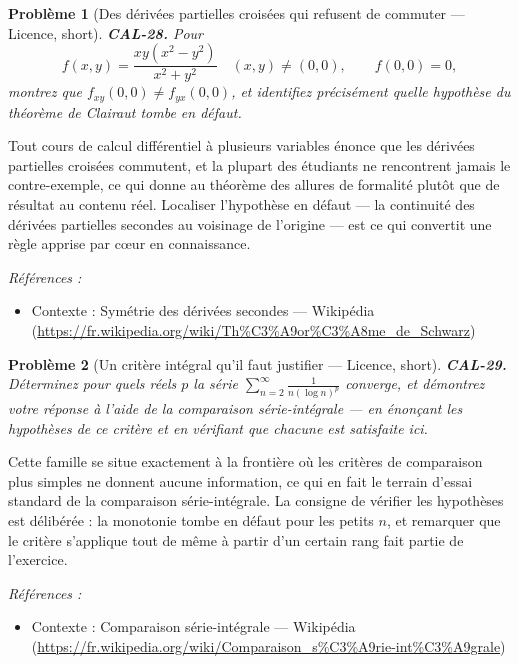 \documentclass[11pt]{article}
\newtheorem{problem}{Problème}
\newenvironment{refs}{\par\small\noindent\emph{Références :}\begin{itemize}\setlength\itemsep{0pt}}{\end{itemize}\normalsize}
\begin{document}
\bigskip

\begin{problem}[{Des dérivées partielles croisées qui refusent de commuter --- Licence, short}]
\textbf{CAL-28.} Pour
\[ f(x,y) = \frac{xy(x^2 - y^2)}{x^2 + y^2} \quad (x,y) \neq (0,0), \qquad f(0,0) = 0, \]
montrez que $ f_{xy}(0,0) \neq f_{yx}(0,0) $, et identifiez précisément quelle hypothèse du théorème de Clairaut tombe en défaut.
\end{problem}

\noindent Tout cours de calcul différentiel à plusieurs variables énonce que les dérivées partielles croisées commutent, et la plupart des étudiants ne rencontrent jamais le contre-exemple, ce qui donne au théorème des allures de formalité plutôt que de résultat au contenu réel. Localiser l'hypothèse en défaut --- la continuité des dérivées partielles secondes au voisinage de l'origine --- est ce qui convertit une règle apprise par c\oe{}ur en connaissance.

\begin{refs}
\item Contexte : Symétrie des dérivées secondes --- Wikipédia (\url{https://fr.wikipedia.org/wiki/Th%C3%A9or%C3%A8me_de_Schwarz})
\end{refs}

\bigskip

\begin{problem}[{Un critère intégral qu'il faut justifier --- Licence, short}]
\textbf{CAL-29.} Déterminez pour quels réels $ p $ la série $ \sum_{n=2}^{\infty} \frac{1}{n (\log n)^{p}} $ converge, et démontrez votre réponse à l'aide de la comparaison série-intégrale --- en énonçant les hypothèses de ce critère et en vérifiant que chacune est satisfaite ici.
\end{problem}

\noindent Cette famille se situe exactement à la frontière où les critères de comparaison plus simples ne donnent aucune information, ce qui en fait le terrain d'essai standard de la comparaison série-intégrale. La consigne de vérifier les hypothèses est délibérée : la monotonie tombe en défaut pour les petits $ n $, et remarquer que le critère s'applique tout de même à partir d'un certain rang fait partie de l'exercice.

\begin{refs}
\item Contexte : Comparaison série-intégrale --- Wikipédia (\url{https://fr.wikipedia.org/wiki/Comparaison_s%C3%A9rie-int%C3%A9grale})
\end{refs}
\end{document}
